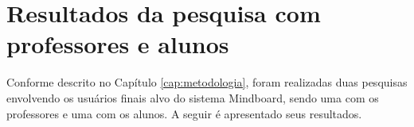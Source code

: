 


\chapter{Resultados da pesquisa com professores e alunos}
\label{cap:resultados_pesquisa_professores_alunos}

Conforme descrito no Capítulo \ref{cap:metodologia}, foram realizadas duas pesquisas envolvendo os usuários finais alvo do sistema Mindboard, sendo uma com os professores e uma com os alunos. A seguir é apresentado seus resultados.








